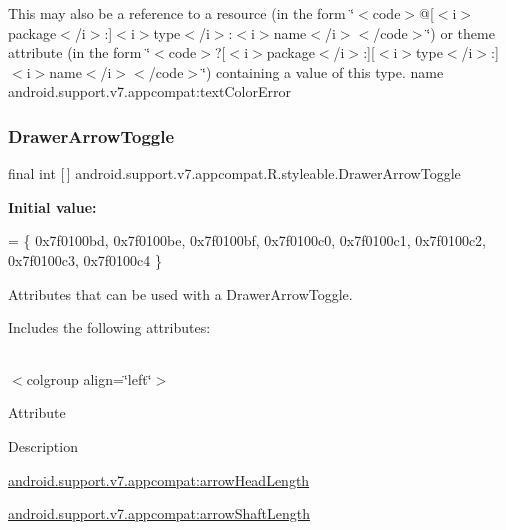 This may also be a reference to a resource (in the form \char`\"{}$<$code$>$@\mbox{[}$<$i$>$package$<$/i$>$\+:\mbox{]}$<$i$>$type$<$/i$>$\+:$<$i$>$name$<$/i$>$$<$/code$>$\char`\"{}) or theme attribute (in the form \char`\"{}$<$code$>$?\mbox{[}$<$i$>$package$<$/i$>$\+:\mbox{]}\mbox{[}$<$i$>$type$<$/i$>$\+:\mbox{]}$<$i$>$name$<$/i$>$$<$/code$>$\char`\"{}) containing a value of this type.  name android.\+support.\+v7.\+appcompat\+:text\+Color\+Error \mbox{\label{classandroid_1_1support_1_1v7_1_1appcompat_1_1R_1_1styleable_a7bd3ecc07eb763b454c40c0871959a35}} 
\subsubsection{\texorpdfstring{Drawer\+Arrow\+Toggle}{DrawerArrowToggle}}
{\footnotesize\ttfamily final int \mbox{[}$\,$\mbox{]} android.\+support.\+v7.\+appcompat.\+R.\+styleable.\+Drawer\+Arrow\+Toggle\hspace{0.3cm}{\ttfamily [static]}}

{\bfseries Initial value\+:}
\begin{DoxyCode}
= \{
            0x7f0100bd, 0x7f0100be, 0x7f0100bf, 0x7f0100c0,
            0x7f0100c1, 0x7f0100c2, 0x7f0100c3, 0x7f0100c4
        \}
\end{DoxyCode}
Attributes that can be used with a Drawer\+Arrow\+Toggle. 

Includes the following attributes\+:

\tabulinesep=1mm
\begin{longtabu} spread 0pt [c]{*{0}{|X[-1]}|}
\hline
\end{longtabu}
$<$colgroup align=\char`\"{}left\char`\"{}$>$ 

Attribute

Description 

{\ttfamily \hyperlink{classandroid_1_1support_1_1v7_1_1appcompat_1_1R_1_1styleable_a2761ca55152ffa3a51ad7b8eeae1c67d}{android.\+support.\+v7.\+appcompat\+:arrow\+Head\+Length}}

{\ttfamily \hyperlink{classandroid_1_1support_1_1v7_1_1appcompat_1_1R_1_1styleable_a4b7bc95a81f9491de6faf46ff4f673b2}{android.\+support.\+v7.\+appcompat\+:arrow\+Shaft\+Length}}

